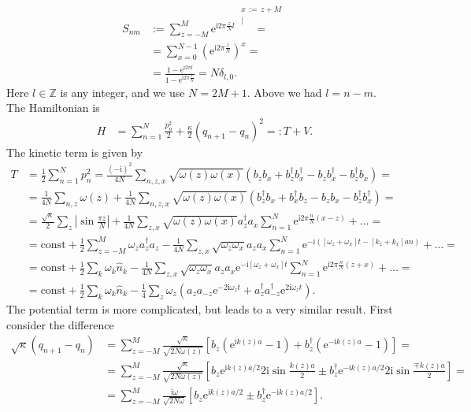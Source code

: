\documentclass[english, parskip=full]{scrartcl}
\newcommand{\kom}{}
\newcommand{\kla}{}
\newcommand{\klam}{}
\newcommand{\tecxt}{}
\def\I{\text{i}}
\def\e{\text{e}}
\begin{document}
\begin{align}
S_{nm}&:=\sum_{z=-M}^M\e^{\I 2\pi\frac{z}{N}l}\kom\overset{\substack{{x\,:=\,z+M} \\ |}}{=}\\
&=\sum_{x=0}^{N-1}\kla\left( {\e^{\I 2\pi \frac{l}{N}}} \right)^x=\\
&=\frac{1-\e^{\I 2\pi l}}{1-\e^{\I 2\pi \frac{l}{N}}}=N\delta_{l,0}.
\end{align}
Here $l\in\mathbb{Z}$ is any integer, and we use $N=2M+1$.
Above we had $l=n-m$.
\\
The Hamiltonian is
\begin{align}
H&=\sum_{n=1}^N\frac{p_n^2}{2}+\frac{\kappa}{2}(q_{n+1}-q_n)^2=:T+V.
\end{align}
The kinetic term is given by
\begin{align}
T&=\frac{1}{2}\sum_{n=1}^Np_n^2=\frac{(-\I)^2}{4N}\sum_{n,z,x}\sqrt{\omega (z)\omega (x)}\kla\left( {b_zb_x+b_z^\dagger b_x^\dagger -b_zb_x^\dagger -b_z^\dagger b_x} \right)=\\
&=\frac{1}{4N}\sum_{n,z}\omega (z)+\frac{1}{4N}\sum_{n,z,x}\sqrt{\omega (z)\omega (x)}\kla\left( {b_z^\dagger b_x+b_x^\dagger b_z-b_z b_x-b_z^\dagger b_x^\dagger} \right)=\\
&=\frac{\sqrt{\kappa}}{2}\sum_z\left\vert\sin\frac{\pi z}{N}\right\vert+\frac{1}{4N}\sum_{z,x}\sqrt{\omega (z)\omega (x)}a_z^\dagger a_x\sum_{n=1}^N\e^{\I 2\pi\frac{n}{N}(x-z)}+\dots=\\
&=\tecxt\text{const}+\frac{1}{2}\sum_{z=-M}^M\omega_za_z^\dagger a_z-\frac{1}{4N}\sum_{z,x}\sqrt{\omega_z\omega_x}a_za_x\sum_{n=1}^N\e^{-\I \kla\left( {[\omega_z+\omega_x]t-[k_z+k_x]an} \right)}+\dots=\\
&=\tecxt\text{const}+\frac{1}{2}\sum_k\omega_k\hat{n}_k-\frac{1}{4N}\sum_{z,x}\sqrt{\omega_z\omega_x}a_za_x\e^{-\I[\omega_z+\omega_x]t}\sum_{n=1}^N\e^{\I 2\pi \frac{n}{N}(z+x)}+\dots=\\
&=\tecxt\text{const}+\frac{1}{2}\sum_k\omega_k\hat{n}_k-\frac{1}{4}\sum_z\omega_z\kla\left( {a_za_{-z}\e^{-2\I\omega_zt}+a_z^{\dagger}a_{-z}^\dagger\e^{2\I\omega_zt}} \right).
\end{align}
The potential term is more complicated, but leads to a very similar result.
First consider the difference
\begin{align}
\sqrt{\kappa}(q_{n+1}-q_n)&=\sum_{z=-M}^M\frac{\sqrt{\kappa}}{\sqrt{2N\omega (z)}}\klam\left[ {b_z\kla\left( {\e^{\I k(z)a}-1} \right)+b_z^\dagger\kla\left( {\e^{-\I k(z)a}-1} \right)} \right]=\\
&=\sum_{z=-M}^M\frac{\sqrt{\kappa}}{\sqrt{2N\omega (z)}}\klam\left[ {b_z\e^{\I k(z)a/2}2\I\sin\frac{k(z)a}{2}\pm b_z^\dagger \e^{-\I k(z)a/2}2\I\sin\frac{\mp k(z)a}{2}} \right]=\\
&=\sum_{z=-M}^M\frac{\I\omega}{\sqrt{2N\omega}}\klam\left[ {b_z\e^{\I k(z)a/2}\pm b_z^\dagger\e^{-\I k(z)a/2}} \right].
\end{align}
\end{document}
